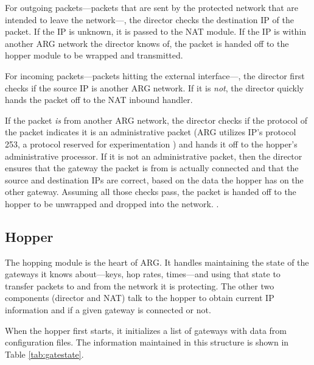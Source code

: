 \par For outgoing packets---packets that are sent by the protected network that are intended to leave the network---, the director checks the destination \ac{IP} of the packet. If the IP is unknown, it is passed to the \ac{NAT} module. If the IP is within another \ac{ARG} network the director knows of, the packet is handed off to the hopper module to be wrapped and transmitted.

\par For incoming packets---packets hitting the external interface---, the director first checks if the source IP is another ARG network. If it is \textit{not}, the director quickly hands the packet off to the NAT inbound handler.

\par If the packet \textit{is} from another ARG network, the director checks if the protocol of the packet indicates it is an administrative packet (ARG utilizes IP's protocol 253, a protocol reserved for experimentation \cite{IANAPorts}) and hands it off to the hopper's administrative processor. If it is not an administrative packet, then the director ensures that the gateway the packet is from is actually connected and that the source and destination IPs are correct, based on the data the hopper has on the other gateway. Assuming all those checks pass, the packet is handed off to the hopper to be unwrapped and dropped into the network.
.

\subsection{Hopper}
\label{sec:arg_hopper}
\par The hopping module is the heart of ARG. It handles maintaining the state of the gateways it knows about---keys, hop rates, times---and using that state to transfer packets to and from the network it is protecting. The other two components (director and \ac{NAT}) talk to the hopper to obtain current IP information and if a given gateway is connected or not.

\par When the hopper first starts, it initializes a list of gateways with data from configuration files. The information maintained in this structure is shown in Table \ref{tab:gatestate}. 

